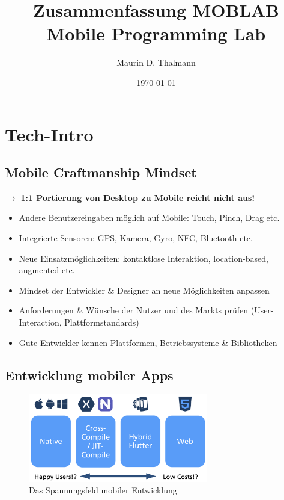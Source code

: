 \documentclass[a4paper]{article}
\title{\textbf{Zusammenfassung MOBLAB} \\
		Mobile Programming Lab}
\date{\today}
\author{Maurin D. Thalmann}
\begin{document}
	
	\maketitle
	
	\newpage
	\tableofcontents
	
	\newpage
	
	\section{Tech-Intro}
	
		\subsection{Mobile Craftmanship Mindset}
		
		$\rightarrow$ \textbf{1:1 Portierung von Desktop zu Mobile reicht nicht aus!}
	
		\begin{itemize}
			\item Andere Benutzereingaben möglich auf Mobile: Touch, Pinch, Drag etc.
			\item Integrierte Sensoren: GPS, Kamera, Gyro, NFC, Bluetooth etc.
			\item Neue Einsatzmöglichkeiten: kontaktlose Interaktion, location-based, augmented etc.
		\end{itemize}
	
		\vspace{1em}
		
		\begin{itemize}
			\item Mindset der Entwickler \& Designer an neue Möglichkeiten anpassen
			\item Anforderungen \& Wünsche der Nutzer und des Markts prüfen (User-Interaction, Plattformstandards)
			\item Gute Entwickler kennen Plattformen, Betriebssysteme \& Bibliotheken
		\end{itemize}
	
		\subsection{Entwicklung mobiler Apps}
		
		\begin{figure}[htb!]
			\centering
			\includegraphics[width=0.7\textwidth]{img/techintro/spannungsfeld_apps.png}
			\caption{Das Spannungsfeld mobiler Entwicklung}
			\label{fig:techintro_spannungsfeld_apps}
		\end{figure}
	
\end{document}
